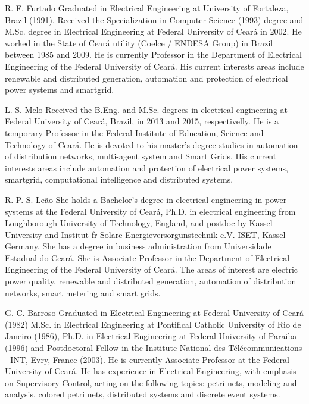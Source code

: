 \documentclass[journal]{IEEEtran}
\begin{document}
\begin{IEEEbiographynophoto}{R. F. Furtado}
  Graduated in Electrical Engineering at University of Fortaleza, Brazil (1991). Received the Specialization in Computer Science (1993) degree and M.Sc. degree in Electrical Engineering at Federal University of Ceará in 2002. He worked in the State of Ceará utility (Coelce / ENDESA Group) in Brazil between 1985 and 2009. He is currently Professor in the Department of Electrical Engineering of the Federal University of Ceará. His current interests areas include renewable and distributed generation, automation and protection of electrical power systems and smartgrid.
\end{IEEEbiographynophoto}
\vspace{-0.5in}
\begin{IEEEbiographynophoto}{L. S. Melo}
  Received the B.Eng. and M.Sc. degrees in electrical engineering at Federal University of Ceará, Brazil, in 2013 and 2015, respectivelly. He is a temporary Professor in the Federal Institute of Education, Science and Technology of Ceará. He is devoted to his master's degree studies in automation of distribution networks, multi-agent system and Smart Grids. His current interests areas include automation and protection of electrical power systems, smartgrid, computational intelligence and distributed systems.
\end{IEEEbiographynophoto}
\vspace{-0.5in}
\begin{IEEEbiographynophoto}{R. P. S. Leão}
  She holds a Bachelor’s degree in electrical engineering in power systems at the Federal University of Ceará, Ph.D. in electrical engineering from Loughborough University of Technology, England, and postdoc by Kassel University and Institut fr Solare Energieversorgunstechnik e.V.-ISET, Kassel-Germany. She has a degree in business administration from Universidade Estadual do Ceará. She is Associate Professor in the Department of Electrical Engineering of the Federal University of Ceará. The areas of interest are electric power quality, renewable and distributed generation, automation of distribution networks, smart metering and smart grids.
\end{IEEEbiographynophoto}
\vspace{-0.5in}
\begin{IEEEbiographynophoto}{G. C. Barroso}
  Graduated in Electrical Engineering at Federal University of Ceará (1982) M.Sc. in Electrical Engineering at Pontifical Catholic University of Rio de Janeiro (1986), Ph.D. in Electrical Engineering at Federal University of Paraiba (1996) and Postdoctoral Fellow in the Institute National des Télécommunications - INT, Evry, France (2003). He is currently Associate Professor at the Federal University of Ceará. He has experience in Electrical Engineering, with emphasis on Supervisory Control, acting on the following topics: petri nets, modeling and analysis, colored petri nets, distributed systems and discrete event systems.
\end{IEEEbiographynophoto}
\end{document}
